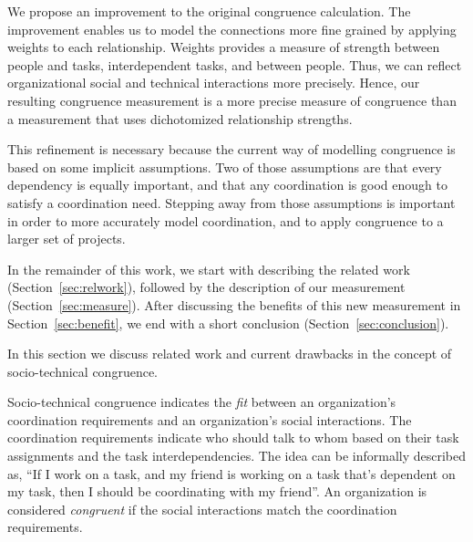 \documentclass[times, 10pt,twocolumn]{article}
\begin{document}
We propose an improvement to the original congruence calculation.
The improvement enables us to model the connections more fine grained by applying weights to each relationship.
Weights provides a measure of strength between people and tasks, interdependent tasks, and between people.
Thus, we can reflect organizational social and technical interactions more precisely.
Hence, our resulting congruence measurement is a more precise measure of congruence than a measurement that uses dichotomized relationship strengths.

This refinement is necessary because the current way of modelling congruence is based on some implicit assumptions.
Two of those assumptions are that every dependency is equally important, and that any coordination is good enough to satisfy a coordination need.
Stepping away from those assumptions is important in order to more accurately model coordination, and to apply congruence to a larger set of projects.




In the remainder of this work, we start with describing the related work (Section~\ref{sec:relwork}), followed by the description of our measurement (Section~\ref{sec:measure}).
After discussing the benefits of this new measurement in Section~\ref{sec:benefit}, we end with a short conclusion (Section~\ref{sec:conclusion}).  

\label{sec:relwork}

In this section we discuss related work and current drawbacks in the concept of socio-technical congruence.

Socio-technical congruence indicates the \emph{fit} between an organization's coordination requirements and an organization's social interactions.
The coordination requirements indicate who should talk to whom based on their task assignments and the task interdependencies.
The idea can be informally described as, ``If I work on a task, and my friend is working on a task that's dependent on my task, then I should be coordinating with my friend''. An organization is considered \emph{congruent} if the social interactions match the coordination requirements.
\end{document}
